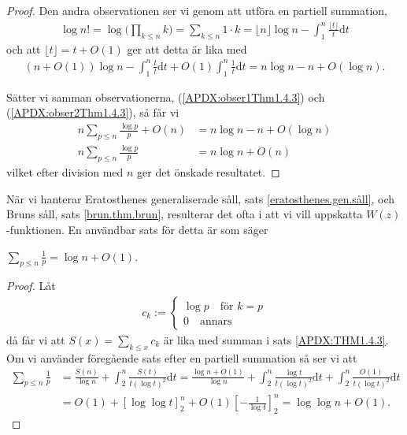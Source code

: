 \begin{proof}
Den andra observationen ser vi genom att utföra en partiell summation,
\begin{align*}
    \log n! = \log \Big(\prod_{k \leq n} k\Big) = \sum_{k \leq n} 1 \cdot k = 
    \lfloor n \rfloor \log n - \int_1^n \frac{\lfloor t \rfloor}{t} \text{d} t 
\end{align*}
och att \(\lfloor t \rfloor = t + O(1)\) ger att detta är lika med
\begin{align} \label{APDX:obser2Thm1.4.3}
    (n + O(1)) \log n - \int_1^n \frac{t}{t} \text{d} t + O(1) \int_1^n \frac{1}{t} \text{d} t  = n \log n - n + O(\log n).
\end{align}

Sätter vi samman observationerna, (\ref{APDX:obser1Thm1.4.3}) och (\ref{APDX:obser2Thm1.4.3}), så får vi 
\begin{align*}
    n \sum_{p \leq n} \frac{\log p}{p} + O(n) &= n \log n - n + O(\log n) \\
    n \sum_{p \leq n} \frac{\log p}{p} &= n \log n + O(n)
\end{align*}
vilket efter division med $n$ ger det önskade resultatet.
\end{proof}

När vi hanterar Eratosthenes generaliserade såll, sats \ref{eratosthenes.gen.såll}, och Bruns såll, sats \ref{brun.thm.brun}, resulterar det ofta i att vi vill uppskatta \(W(z)\)-funktionen. En användbar sats för detta är \cite[Sats 1.4.4]{cojocarumurty} som säger
\begin{theorem} \label{APDX:THM1.4.4}
    \(\sum_{p \leq n} \frac{1}{p} = \log n + O(1)\).
\end{theorem}
\begin{proof}
Låt
\begin{align*}
    c_k := 
    \begin{cases}
    \log p \quad \text{för } k = p \\
    0 \quad \text{annars}
    \end{cases}
\end{align*}
då får vi att \(S(x) = \sum_{k \leq x} c_k\) är lika med summan i sats \ref{APDX:THM1.4.3}. Om vi använder föregående sats efter en partiell summation så ser vi att
\begin{align*}
    \sum_{p \leq n} \frac{1}{p} &= \frac{S(n)}{\log n} + \int_2^n \frac{S(t)}{t(\log t)^2} \text{d}t 
    = \frac{\log n + O(1)}{\log n} + \int_2^n \frac{\log t}{t(\log t)^2} \text{d}t + \int_2^n \frac{O(1)}{t(\log t)^2} \text{d}t \\
    &= O(1) + \left[\log \log t \right]_2^n + O(1) \left[- \frac{1}{\log t} \right]_2^n
    = \log \log n  + O(1).
\end{align*}

\end{proof}